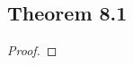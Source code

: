 \documentclass[../../main.tex]{subfiles}
\begin{document}
\subsection{Theorem 8.1}
\begin{wts}

\end{wts}
\begin{proof}

\end{proof}
\end{document}
